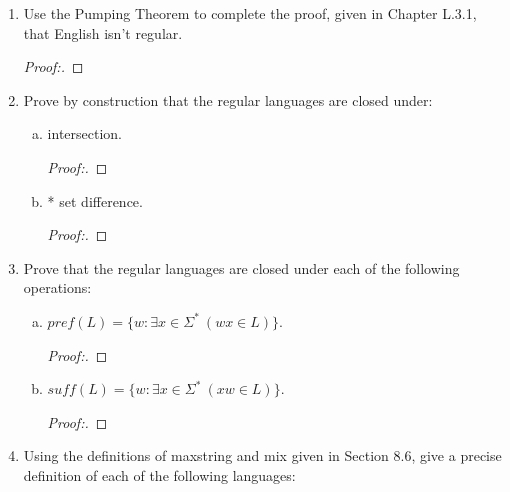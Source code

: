 \documentclass[10pt]{article}
\begin{document}
\begin{enumerate}[1)]
\begin{enumerate}[a)]
\item
$\{xyzy^Rx\ :\ x, y, z \in \{a, b\}^+\}$.
\begin{proof}[Answer:]
\end{proof}
\begin{proof}[Proof:]
\end{proof}
\end{enumerate}



\item
Use the Pumping Theorem to complete the proof, given in Chapter L.3.1, that English isn’t regular.
\begin{proof}[Proof:]
\end{proof}


\item
Prove by construction that the regular languages are closed under:

\begin{enumerate}[a)]
\item
intersection.
\begin{proof}[Proof:]
\end{proof}
 
\item
* set difference.
\begin{proof}[Proof:]
\end{proof}
\end{enumerate}

\item
Prove that the regular languages are closed under each of the following operations:
\begin{enumerate}[a)]
\item
$pref(L) = \{w: \exists x \in \Sigma ^*\ (wx \in L)\}$.
\begin{proof}[Proof:]
\end{proof}

\item
$suff(L) = \{w: \exists x \in \Sigma ^*\ (xw \in L)\}$.
\begin{proof}[Proof:]
\end{proof}
\end{enumerate}



\item
Using the definitions of  maxstring and  mix given in Section  8.6, give a precise definition of each of the 
following languages:


\end{enumerate}
\end{document}
